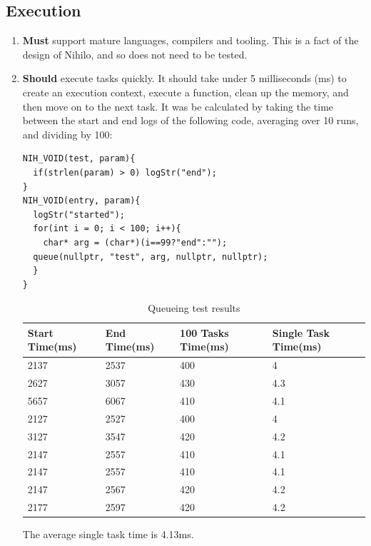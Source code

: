 \documentclass{article}
\begin{document}
\subsection{Execution}
\begin{enumerate}
\item \textbf{Must} support mature languages, compilers and tooling. This is a fact of the design of Nihilo, and so does not need to be tested.
\item \textbf{Should} execute tasks quickly. It should take under 5 milliseconds (ms) to create an execution context, execute a function, clean up the memory, and then move on to the next task. It was be calculated by taking the time between the start and end logs of the following code, averaging over 10 runs, and dividing by 100:
\begin{tcolorbox}[colback=white,grow to left by=2.5mm,grow to right by=2.5mm,left*=0mm,right*=0mm,sharp corners]
\begin{verbatim}
NIH_VOID(test, param){
  if(strlen(param) > 0) logStr("end");
}
NIH_VOID(entry, param){
  logStr("started");
  for(int i = 0; i < 100; i++){
    char* arg = (char*)(i==99?"end":"");
  queue(nullptr, "test", arg, nullptr, nullptr);
  }
}
\end{verbatim}
\end{tcolorbox}

\begin{table}[H]
\begin{tabular}{|l|l|l|l|}
\hline
Start Time(ms)		&End Time(ms)		&100 Tasks Time(ms)		&Single Task Time(ms)		\\ \hline
2137							&2537						&400    							&4\\ \hline
2627							&3057						&430	    						&4.3\\ \hline
5657							&6067						&410		    					&4.1\\ \hline
2127							&2527						&400			    				&4\\ \hline
3127							&3547						&420				    			&4.2\\ \hline
2147							&2557						&410					    		&4.1\\ \hline
2147							&2557						&410						    	&4.1\\ \hline
2147							&2567						&420						    	&4.2\\ \hline
2177							&2597						&420							    &4.2 \\ \hline
\end{tabular}
\caption{Queueing test results}
\end{table}

The average single task time is 4.13ms.

\end{enumerate}
\end{document}
